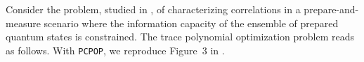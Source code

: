 Consider the problem, studied in \cite{Tavakoli2022informationally}, of characterizing correlations in a prepare-and-measure scenario where the information capacity of the ensemble of prepared quantum states is constrained.
The trace polynomial optimization problem reads as follows.
With \texttt{PCPOP}, we reproduce Figure~3 in \cite{Tavakoli2022informationally}.

